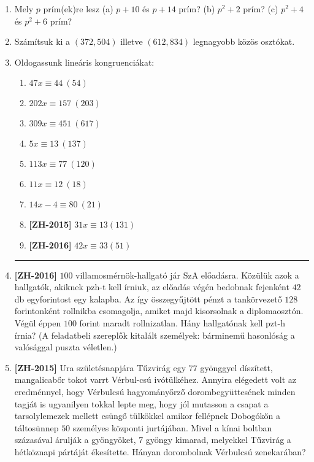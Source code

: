 \documentclass[a4paper, 12pt]{article}
\begin{document}
        \noindent{}
        \noindent{}
        
        \begin{enumerate}
            \item Mely $p$ prím(ek)re lesz (a) $p+10$ és $p+14$ prím? (b) $p^2 + 2$ prím? (c) $p^2 + 4$ és $p^2 + 6$ prím?
            \item Számítsuk ki a $(372, 504)$ illetve $(612, 834)$ legnagyobb közös osztókat.
            \item Oldogassunk lineáris kongruenciákat:
            \begin{multicols}{3}			
                \begin{enumerate}
                    \item $47x \equiv 44 \ (54)$
                    \item $202 x \equiv 157 \ (203)$
                    \item $309 x \equiv 451 \ (617)$
                    \item $5x \equiv 13 \ (137)$
                    \item $113x \equiv 77 \ (120)$
                    \item $11x \equiv 12 \ (18)$
                    \item $14x - 4 \equiv 80 \ (21)$
                    \item \textbf{[ZH-2015]} $31x \equiv 13 (131)$
                    \item \textbf{[ZH-2016]} $42x \equiv 33 (51)$
                \end{enumerate}
            \end{multicols}

            \hrule

            
            \item \textbf{[ZH-2016]} $100$ villamosmérnök-hallgató jár SzA előadásra. Közülük azok a hallgatók, akiknek pzh-t kell írniuk, az előadás végén bedobnak fejenként $42$ db egyforintost egy kalapba. Az így összegyűjtött pénzt a tankörvezető $128$ forintonként rollnikba csomagolja, amiket majd kisorsolnak a diplomaosztón. Végül éppen $100$ forint maradt rollnizatlan. Hány hallgatónak kell pzt-h írnia? (A feladatbeli szereplők kitalált személyek: bárminemű hasonlóság a valósággal puszta véletlen.)
            \item \textbf{[ZH-2015]} Ura születésnapjára Tűzvirág egy $77$ gyönggyel díszített, mangalicabőr tokot varrt Vérbul-csú ivótülkéhez. Annyira elégedett volt az eredménnyel, hogy Vérbulcsú hagyományőrző dorombegyüttesének minden tagját is ugyanilyen tokkal lepte meg, hogy jól mutasson a csapat a tarsolylemezek mellett csüngő tülkökkel amikor fellépnek Dobogókőn a táltosünnep $50$ személyes központi jurtájában. Mivel a kínai boltban százasával árulják a gyöngyöket, $7$ gyöngy kimarad, melyekkel Tűzvirág a hétköznapi pártáját ékesítette. Hányan dorombolnak Vérbulcsú zenekarában?


\end{enumerate}
\end{document}
